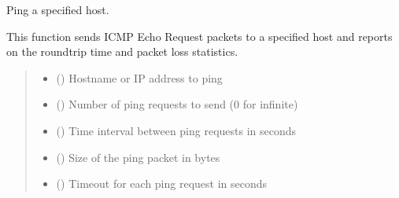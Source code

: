 \documentclass[letterpaper,10pt,english]{sphinxmanual}
\begin{document}
\begin{fulllineitems}
\label{\detokenize{ping:ping.ping}}
\pysigstartsignatures
\pysiglinewithargsret
{}
{\sphinxparamcomma {}\sphinxparamcomma {}\sphinxparamcomma {}\sphinxparamcomma {}}
{}
\pysigstopsignatures
\sphinxAtStartPar
Ping a specified host.

\sphinxAtStartPar
This function sends ICMP Echo Request packets to a specified host and
reports on the round\sphinxhyphen{}trip time and packet loss statistics.
\begin{quote}\begin{description}
\begin{itemize}
\item {} 
\sphinxAtStartPar
{} () \textendash{} Hostname or IP address to ping

\item {} 
\sphinxAtStartPar
{} () \textendash{} Number of ping requests to send (0 for infinite)

\item {} 
\sphinxAtStartPar
{} () \textendash{} Time interval between ping requests in seconds

\item {} 
\sphinxAtStartPar
{} () \textendash{} Size of the ping packet in bytes

\item {} 
\sphinxAtStartPar
{} () \textendash{} Timeout for each ping request in seconds

\end{itemize}

\end{description}\end{quote}

\end{fulllineitems}
\end{document}
